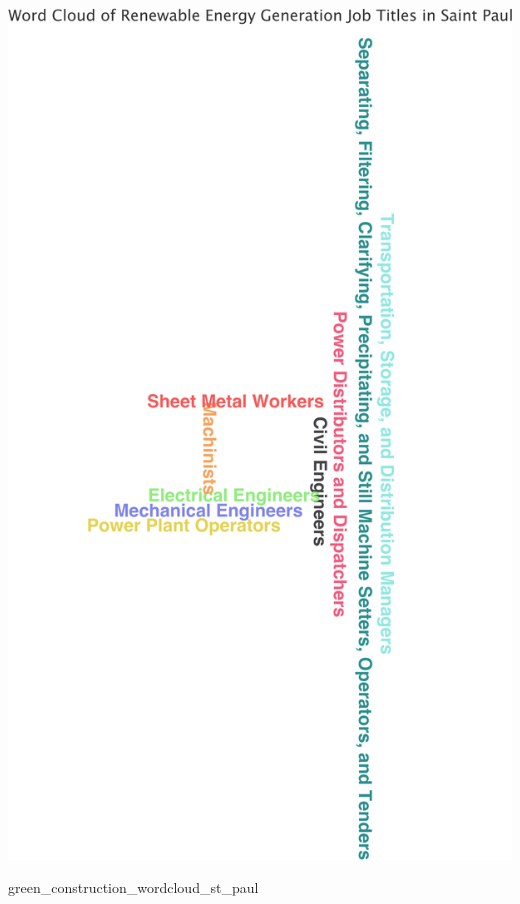 \documentclass[
  letterpaper,
  DIV=11,
  numbers=noendperiod]{scrartcl}
\newenvironment{Shaded}{\begin{snugshade}}{\end{snugshade}}
\newcommand{\NormalTok}[1]{\textcolor[rgb]{0.00,0.23,0.31}{#1}}
\begin{document}
\includegraphics{index_files/figure-pdf/unnamed-chunk-23-2.pdf}

\begin{Shaded}
\begin{Highlighting}[]
\NormalTok{green\_construction\_wordcloud\_st\_paul}
\end{Highlighting}
\end{Shaded}
\end{document}
